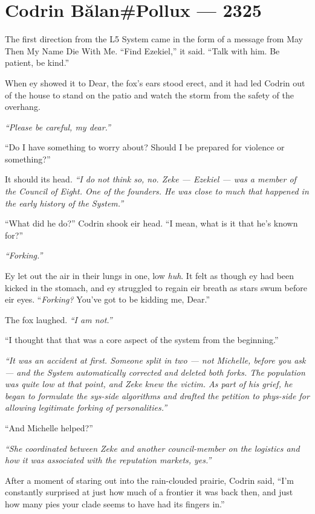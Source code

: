 \hypertarget{codrin-bux103lanpollux-2325}{%
\chapter{Codrin Bălan\#Pollux — 2325}\label{codrin-bux103lanpollux-2325}}

The first direction from the L5 System came in the form of a message from May Then My Name Die With Me. ``Find Ezekiel,'' it said. ``Talk with him. Be patient, be kind.''

When ey showed it to Dear, the fox's ears stood erect, and it had led Codrin out of the house to stand on the patio and watch the storm from the safety of the overhang.

\emph{``Please be careful, my dear.''}

``Do I have something to worry about? Should I be prepared for violence or something?''

It should its head. \emph{``I do not think so, no. Zeke — Ezekiel — was a member of the Council of Eight. One of the founders. He was close to much that happened in the early history of the System.''}

``What did he do?'' Codrin shook eir head. ``I mean, what is it that he's known for?''

\emph{``Forking.''}

Ey let out the air in their lungs in one, low \emph{huh}. It felt as though ey had been kicked in the stomach, and ey struggled to regain eir breath as stars swum before eir eyes. ``\emph{Forking?} You've got to be kidding me, Dear.''

The fox laughed. \emph{``I am not.''}

``I thought that that was a core aspect of the system from the beginning.''

\emph{``It was an accident at first. Someone split in two — not Michelle, before you ask — and the System automatically corrected and deleted both forks. The population was quite low at that point, and Zeke knew the victim. As part of his grief, he began to formulate the sys-side algorithms and drafted the petition to phys-side for allowing legitimate forking of personalities.''}

``And Michelle helped?''

\emph{``She coordinated between Zeke and another council-member on the logistics and how it was associated with the reputation markets, yes.''}

After a moment of staring out into the rain-clouded prairie, Codrin said, ``I'm constantly surprised at just how much of a frontier it was back then, and just how many pies your clade seems to have had its fingers in.''

